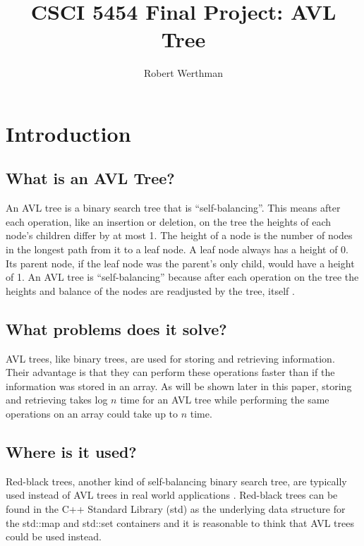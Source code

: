 \documentclass[12pt]{article}
\title{CSCI 5454 Final Project: AVL Tree}
\author{Robert Werthman}
\date{}
\begin{document}
\maketitle

\newpage
\tableofcontents

\newpage
{}
\section*{Introduction}

\subsection*{What is an AVL Tree?}

An AVL tree is a binary search tree that is ``self-balancing''.  This means
after each operation, like an insertion or deletion, on the tree the heights of 
each node's children differ by at most 1.  The height of a node is the number of
nodes in the longest path from it to a leaf node.  A leaf node
always has a height of 0. Its parent node, if the leaf
node was the parent's only child, would have a height of 1.  An AVL tree is
``self-balancing'' because after each operation on the tree the heights and balance of the nodes are readjusted by the tree,
itself \cite{wiki:avl}.

\subsection*{What problems does it solve?}
AVL trees, like binary trees, are used for storing and retrieving
information.  Their advantage is that they can perform these operations faster
than if the information was stored in an array.  As will be shown later in this
paper, storing and retrieving takes log $n$ time for an AVL tree
while performing the same operations on an array could take up to $n$ time.

\subsection*{Where is it used?}
Red-black trees, another kind of self-balancing binary search tree, are
typically used instead of AVL trees in real world applications
\cite{wiki:red-black}.
Red-black trees can be found in the C++ Standard Library (std) as the underlying data structure
for the std::map and std::set containers and it is reasonable to think that AVL
trees could be used instead.
\end{document}
